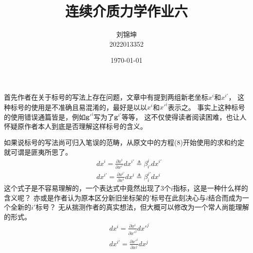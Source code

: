 \documentclass[UTF8]{ctexart}
\title{连续介质力学作业六}
\author{刘锦坤\\2022013352}
\date{\today}
\begin{document}
\maketitle

首先作者在关于标号的写法上存在问题，文章中有提到两组新老坐标$x^i$和$x^{i'}$，
这种标号的使用是不准确且易混淆的，最好是以以$x^i$和$x'^i$表示之。
事实上这种标号的使用错误通篇皆是，例如$\boldsymbol g'^i$写为了$\boldsymbol g^{i'}$等等，
这不仅使得读者阅读困难，也让人怀疑原作者本人到底是否理解这样标号的含义。

如果说标号的写法尚可归入笔误的范畴，从原文中的方程(8)开始使用的求和约定就可谓是匪夷所思了。
\begin{equation}
    \begin{aligned}
    &dx^i=\frac{\partial x^i}{\partial x^{i'}}dx^{i'} \triangleq \beta^i_{i'}dx^{i'}\\
    &dx^{i'}=\frac{\partial x^{i'}}{\partial x^i}dx^i \triangleq \beta^{i'}_{i}dx^i
    \end{aligned}
    \tag*{(8)}
\end{equation}
这个式子是不容易理解的，一个表达式中竟然出现了3个$i$指标，这是一种什么样的含义呢？
亦或是作者认为原本区分新旧坐标架的$'$标号在此刻决心与$i$结合而成为一个全新的$i'$标号？
无从揣测作者的真实想法，但大概可以修改为一个常人尚能理解的形式。
\begin{equation}
    \begin{aligned}
    &dx^i=\frac{\partial x^i}{\partial x'^{j}}dx'^{j}\\
    &dx^{i'}=\frac{\partial x'^i}{\partial x^j}dx^j
    \end{aligned}
    \tag*{(8)}
\end{equation}
\end{document}
